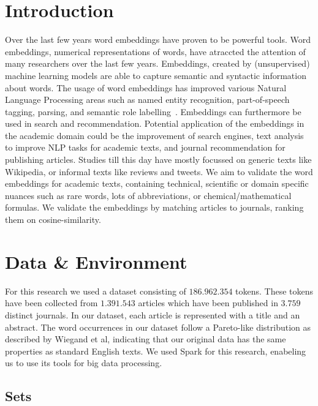 \documentclass[runningheads]{llncs}
\begin{document}
\section{Introduction}
Over the last few years word embeddings have proven to be powerful tools. Word embeddings, numerical representations of words, have atraccted the attention of many researchers over the last few years. Embeddings, created by (unsupervised) machine learning models\cite{lai2016generate} are able to capture semantic and syntactic information about words\cite{mikolov2013distributed}. The usage of word embeddings has improved various Natural Language Processing areas such as named entity recognition, part-of-speech tagging, parsing, and semantic role labelling~\cite{luong2013better}. Embeddings can furthermore be used in search and recommendation. Potential application of the embeddings in the academic domain could be the improvement of search engines, text analysis to improve NLP tasks for academic texts, and journal recommendation for publishing articles. Studies till this day have mostly focussed on generic texts like Wikipedia, or informal texts like reviews and tweets. We aim to validate the word embeddings for academic texts, containing technical, scientific or domain specific nuances such as rare words, lots of abbreviations, or chemical/mathematical formulas. We validate the embeddings by matching articles to journals, ranking them on cosine-similarity.
\section{Data \& Environment}
For this research we used a dataset consisting of $186.962.354$ tokens. These tokens have been collected from $1.391.543$ articles which have been published in $3.759$ distinct journals. In our dataset, each article is represented with a title and an abstract. The word occurrences in our dataset follow a Pareto-like distribution as described by Wiegand et al\cite{wiegand2018word}, indicating that our original data has the same properties as standard English texts. We used Spark for this research, enabeling us to use its tools for big data processing\cite{armbrust2015spark}.
\subsection{Sets}
\end{document}
